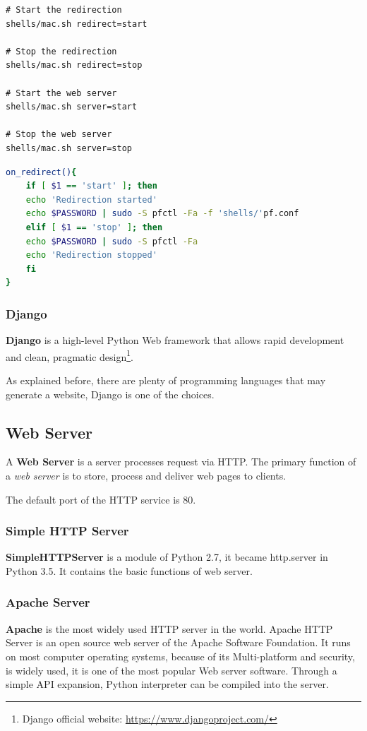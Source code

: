 \begin{lstlisting}[caption={Start/stop redirection/server sample}]
# Start the redirection
shells/mac.sh redirect=start

# Stop the redirection
shells/mac.sh redirect=stop

# Start the web server
shells/mac.sh server=start

# Stop the web server
shells/mac.sh server=stop
\end{lstlisting}

\begin{lstlisting}[language=bash, caption={Redirection is implemented using also shell script, see shells/mac.sh for more details.}]
on_redirect(){
	if [ $1 == 'start' ]; then
	echo 'Redirection started'
	echo $PASSWORD | sudo -S pfctl -Fa -f 'shells/'pf.conf
	elif [ $1 == 'stop' ]; then
	echo $PASSWORD | sudo -S pfctl -Fa
	echo 'Redirection stopped'
	fi
}
\end{lstlisting}

\subsubsection{Django}
\textbf{Django} is a high-level Python Web framework that allows rapid development and clean, pragmatic design\footnote{Django official website: \url{https://www.djangoproject.com/}}.

As explained before, there are plenty of programming languages that may generate a website, Django is one of the choices.

\subsection{Web Server}

A \textbf{Web Server} is a server processes request via HTTP. The primary function of a \textit{web server} is to store, process and deliver web pages to clients.

The default port of the HTTP service is 80. 

\subsubsection{Simple HTTP Server}

\textbf{SimpleHTTPServer} is a module of Python 2.7, it became http.server in Python 3.5. It contains the basic functions of web server.

\subsubsection{Apache Server}
\textbf{Apache} is the most widely used HTTP server in the world. Apache HTTP Server is an open source web server of the Apache Software Foundation. It runs on most computer operating systems, because of its Multi-platform and security, is widely used, it is one of the most popular Web server software. Through a simple API expansion, Python interpreter can be compiled into the server.

